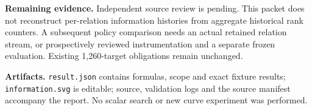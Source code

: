 \documentclass[11pt]{article}
\begin{document}
\textbf{Remaining evidence.} Independent source review is pending. This packet does not reconstruct per-relation information histories from aggregate historical rank counters. A subsequent policy comparison needs an actual retained relation stream, or prospectively reviewed instrumentation and a separate frozen evaluation. Existing 1,260-target obligations remain unchanged.

\textbf{Artifacts.} \texttt{result.json} contains formulas, scope and exact fixture results; \texttt{information.svg} is editable; source, validation logs and the source manifest accompany the report. No scalar search or new curve experiment was performed.
\end{document}
